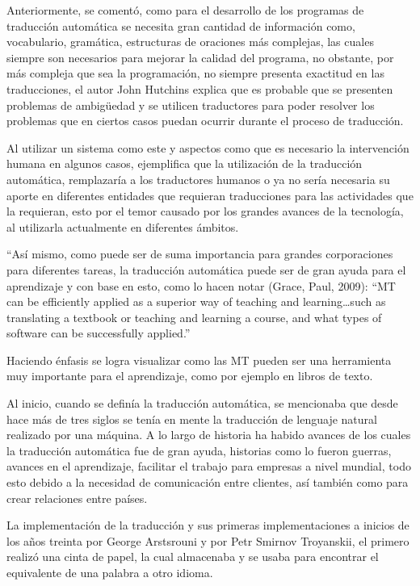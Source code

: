 \documentclass[conference]{IEEEtran}
\begin{document}
Anteriormente, se comentó, como para el desarrollo de los programas de traducción automática se necesita gran cantidad de información como, vocabulario, gramática, estructuras de oraciones más complejas, las cuales siempre son necesarios para mejorar la calidad del programa, no obstante, por más compleja que sea la programación, no siempre presenta exactitud en las traducciones, el autor John Hutchins explica que es probable que se presenten problemas de ambigüedad y se utilicen traductores para poder resolver los problemas que en ciertos casos puedan ocurrir durante el proceso de traducción. \cite{b3}

Al utilizar un sistema como este y aspectos como que es necesario la intervención humana en algunos casos, ejemplifica que la utilización de la traducción automática, remplazaría a los traductores humanos o ya no sería necesaria su aporte en diferentes entidades que requieran traducciones para las actividades que la requieran, esto por el temor causado por los grandes avances de la tecnología, al utilizarla actualmente en diferentes ámbitos.

“Así mismo, como puede ser de suma importancia para grandes corporaciones para diferentes tareas, la traducción automática puede ser de gran ayuda para el aprendizaje y con base en esto, como lo hacen notar (Grace, Paul, 2009): “MT can be efficiently applied as a superior way of teaching and learning…such as translating a textbook or teaching and learning a course, and what types of software can be successfully applied.”\cite{b5}

Haciendo énfasis se logra visualizar como las MT pueden ser una herramienta muy importante para el aprendizaje, como por ejemplo en libros de texto.

Al inicio, cuando se definía la traducción automática, se mencionaba que desde hace más de tres siglos se tenía en mente la traducción de lenguaje natural realizado por una máquina. A lo largo de historia ha habido avances de los cuales la traducción automática fue de gran ayuda, historias como lo fueron guerras, avances en el aprendizaje, facilitar el trabajo para empresas a nivel mundial, todo esto debido a la necesidad de comunicación entre clientes, así también como para crear relaciones entre países.

La implementación de la traducción y sus primeras implementaciones a inicios de los años treinta por George Arstsrouni y por Petr Smirnov Troyanskii, el primero realizó una cinta de papel, la cual almacenaba y se usaba para encontrar el equivalente de una palabra a otro idioma.
\end{document}
